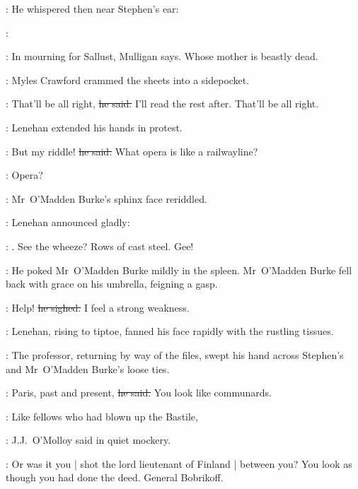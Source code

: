 :
He whispered then near Stephen's ear:



\lenehan:


\StephenInt:
In mourning for Sallust,
Mulligan says.
Whose mother is beastly dead.

:
Myles Crawford crammed the sheets into a sidepocket.

\crawford:
That'll be all right,
\sout{he said.}
I'll read the rest after.
That'll be all right.

:
Lenehan extended his hands in protest.

\lenehan:
But my riddle!
\sout{he said.}
What opera is like a railwayline?

\omaddenburke:
Opera?

:
Mr~O'Madden Burke's sphinx face reriddled.

:
Lenehan announced gladly:

\lenehan:
.
See the wheeze?
Rows of cast steel.
Gee!

:
He poked Mr~O'Madden Burke mildly in the spleen.
Mr~O'Madden Burke fell back with grace on his umbrella,
feigning a gasp.

\omaddenburke:
Help!
\sout{he sighed.}
I feel a strong weakness.

:
Lenehan,
rising to tiptoe,
fanned his face rapidly with the rustling tissues.

:
The professor,
returning by way of the files,
swept his hand across Stephen's and Mr~O'Madden Burke's loose ties.

\machugh:
Paris, past and present,
\sout{he said.}
You look like communards.

\jjom:
Like fellows who had blown up the Bastile,

:
J.J.~O'Molloy said in quiet mockery.

\jjom:
Or was it you |
shot the lord lieutenant of Finland |
between you?
You look as though you had done the deed.
General Bobrikoff.



